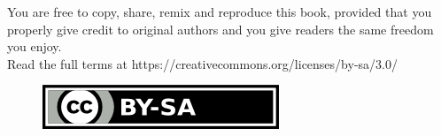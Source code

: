 \vfill
\noindent
You are free to copy, share, remix and reproduce this book, provided that you properly give credit to original authors and you give readers the same freedom you enjoy.\\
Read the full terms at https://creativecommons.org/licenses/by-sa/3.0/\\
\begin{figure}[!h]
	\centering
	\includegraphics{CC-BY-SA_iconSmall.png}
\end{figure}